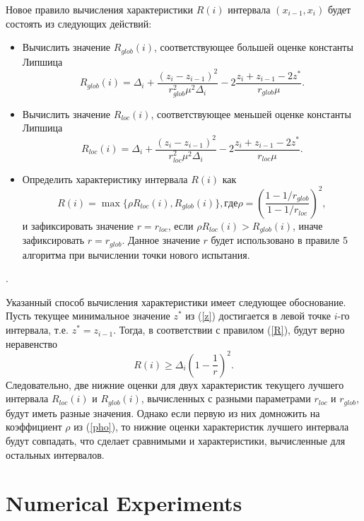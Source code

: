 \documentclass[runningheads]{llncs}
\begin{document}
Новое правило вычисления характеристики $R(i)$ интервала $(x_{i-1}, x_i)$ будет состоять из следующих действий:
\begin{itemize}
\item
Вычислить значение $R_{glob}(i)$, соответствующее большей оценке константы Липшица
\[
R_{glob}(i)=\Delta_i+\frac{(z_i-z_{i-1})^2}{r_{glob}^2\mu^2\Delta_i}-2\frac{z_i+z_{i-1}-2z^*}{r_{glob}\mu}.
\]
\item
Вычислить значение $R_{loc}(i)$, соответствующее меньшей оценке константы Липшица
\[
R_{loc}(i)=\Delta_i+\frac{(z_i-z_{i-1})^2}{r_{loc}^2\mu^2\Delta_i}-2\frac{z_i+z_{i-1}-2z^*}{r_{loc}\mu}.
\]
\item
Определить характеристику интервала $R(i)$ как
\begin{equation}\label{pho}
R(i) = \max\{\rho R_{loc}(i),R_{glob}(i)\}, где \rho = \left(\frac{1-1/r_{glob}}{1-1/r_{loc}}\right)^2,
\end{equation}
и зафиксировать значение $r = r_{loc}$, если  $\rho R_{loc}(i) > R_{glob}(i)$, иначе зафиксировать $r=r_{glob}$.
Данное значение $r$ будет использовано в правиле 5 алгоритма при вычислении точки нового испытания.   
\end{itemize}.

Указанный способ вычисления характеристики имеет следующее обоснование. 
Пусть текущее минимальное значение $z^*$ из (\ref{z}) достигается в левой точке $i$-го интервала, т.е. $z^* = z_{i-1}$. Тогда, в соответствии с правилом (\ref{R}), будут верно неравенство
\[
R(i) \geq \Delta_i \left( 1 - \frac{1}{r} \right)^2.
\]
Следовательно, две нижние оценки для двух характеристик текущего лучшего интервала $R_{loc}(i)$ и $R_{glob}(i)$, вычисленных с разными параметрами $r_{loc}$ и $r_{glob}$, будут иметь разные значения.
Однако если первую из них домножить на коэффициент $\rho$ из (\ref{pho}), то нижние оценки характеристик лучшего интервала будут совпадать, что сделает сравнимыми и характеристики, вычисленные для остальных интервалов.

\section{Numerical Experiments}
\end{document}
